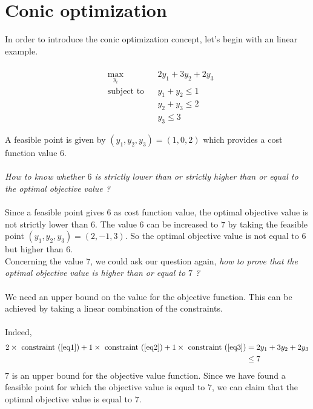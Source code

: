 \section{Conic optimization}
In order to introduce the conic optimization concept, let's begin with an linear example. 
\begin{example}
\begin{leftbar}
\label{ex:C1}
\begin{align}
& & \nonumber \\ 
& \underset{y_i}{\max} \nonumber
& & 2y_1+3y_2+2y_3 \nonumber \\ 
& \text{subject to}
& & y_1 + y_2 \leq 1 \label{eq1} \\
& & & y_2 + y_3 \leq 2 \label{eq2} \\
& & & y_3 \leq 3 \label{eq3}
\end{align}

A feasible point is given by $(y_1,y_2,y_3)= (1,0,2)$ which provides a cost function value $6$. \\ \\ \textit{How to know whether $6$ is strictly lower than or strictly higher than or equal to the optimal objective value ?}  \\ \\ Since a feasible point gives $6$ as cost function value, the optimal objective value is not strictly lower than $6$. The value $6$ can be increased to $7$ by taking the feasible point $(y_1,y_2,y_3)= (2,-1,3)$. So the optimal objective value is not equal to $6$ but higher than $6$.\\ Concerning the value $7$, we could ask our question again,\textit{ how to prove that the optimal objective value is higher than or equal to $7$ ? } \\ \\ We need an upper bound on the value for the objective function. This can be achieved by taking a linear combination of the constraints. \\ \\ Indeed, 
\begin{align*}
2 \times \text{~constraint~} (\ref{eq1})+ 1 \times \text{~constraint~} (\ref{eq2})+ 1 \times \text{~constraint~}(\ref{eq3}) & = 2y_1+3y_2+2y_3 \\
& \leq 7
\end{align*}
$7$ is an upper bound for the objective value function. Since we have found a feasible point for which the objective value is equal to $7$, we can claim that the optimal objective value is equal to $7$. 
\end{leftbar}
\end{example}

